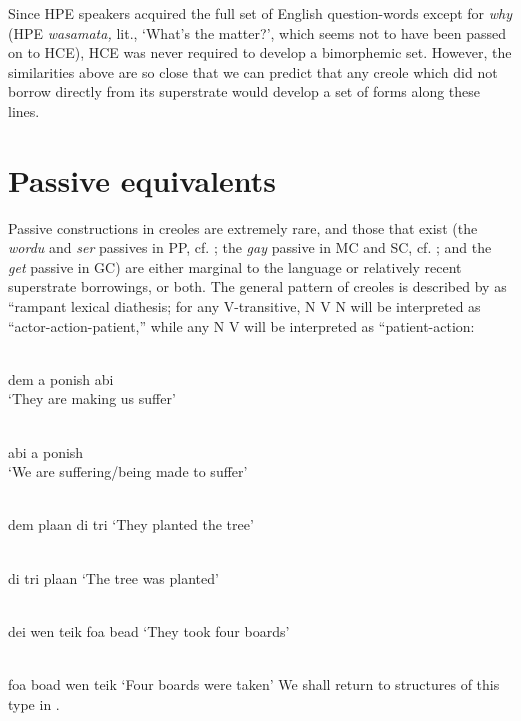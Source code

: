 Since HPE speakers acquired the full set of English question-words except for \textit{why} (HPE \textit{wasamata,} lit., `What's the matter?', which seems not to have been passed on to HCE), HCE was never required to develop a bimorphemic set. However, the similarities above are so close that we can predict that any creole which did not borrow directly from its superstrate would develop a set of forms along these lines.

\section{Passive equivalents}

Passive constructions in creoles are extremely rare, and those that exist (the \textit{wordu} and \textit{ser} passives in PP, cf. \citealt{MarkeyEtAl1980}; the \textit{gay} passive in MC and SC, cf. \citealt{Corne1977}; and the \textit{get} passive in
GC) are either marginal to the language or relatively recent super\-strate borrowings, or both. The general pattern of creoles is described by \citet{MarkeyEtAl1980} as ``rampant lexical diathesis{\textquotedbl}; for any V-transitive, N V N will be interpreted as ``actor-action-patient,'' while any N V will be interpreted as ``patient-action{\textquotedbl}:

\ea\label{ex:2:86}
 \\
 dem a ponish abi\\
\glt `They are making us suffer'
\z

\ea\label{ex:2:87}
\\
abi a ponish\\
\glt `We are suffering/being made to suffer'
\z

\ea\label{ex:2:88}
 \\
  dem plaan di tri
\glt `They planted the tree'
\z

\ea\label{ex:2:89}
\\
di tri plaan
\glt `The tree was planted'
\z

\ea\label{ex:2:90}
 \\
 dei wen teik foa bead
\glt `They took four boards'
\z

\ea\label{ex:2:91}
\\
foa boad wen teik
\glt `Four boards were taken'
\z
We shall return to structures of this type in .\\\\

